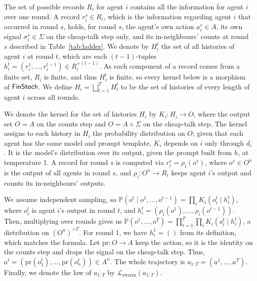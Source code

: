 \begin{definition}[Swarm]\label{def:swarm}
    The set of possible records $R_i$ for agent $i$ contains all the information for agent $i$ over one round.
    A record $r^s_i \in R_i$, which is the information regarding agent $i$ that occurred in round $s$, holds, for round $s$, the agent's own action $a^s_i \in A$, its own signal $\sigma^s_i \in \Sigma$ on the cheap-talk step only, and its in-neighbours' counts at round $s$ described in Table~\ref{tab:ladder}.
    We denote by $H^t_i$ the set of all histories of agent $i$ at round $t$, which are each $(t-1)$-tuples $h^t_i = (r^1_i, \ldots, r^{t-1}_i) \in R^{\times(t-1)}_i$.
    As each component of a record comes from a finite set, $R_i$ is finite, and thus $H^t_i$ is finite, so every kernel below is a morphism of $\mathsf{FinStoch}$.
    We define $H_i = \bigsqcup_{t=1}^{T} H_i^t$ to be the set of histories of every length of agent $i$ across all rounds.
    
    We denote the kernel for the set of histories $H_i$ by $K_i \colon H_i \to O$, where the output set $O = A$ on the counts step and $O = A \times \Sigma$ on the cheap-talk step.
    The kernel assigns to each history in $H_i$ the probability distribution on $O$; given that each agent has the same model and prompt template, $K_i$ depends on $i$ only through $d_i$.
    It is the model's distribution over its output, given the prompt built from $h$, at temperature 1.
    A record for round $s$ is computed via $r^s_i = \rho_i(o^s)$, where $o^s \in O^n$ is the output of all agents in round $s$, and $\rho_i \colon O^n \to R_i$ keeps agent $i$'s output and counts its in-neighbours' outputs.

    We assume independent sampling, so $\mathbb{P}(o^t \mid o^1, \ldots, o^{t-1}) = \prod_i K_i(o^t_i \mid h^t_i)$, where $o^t_i$ is agent $i$'s output in round $t$, and $h^t_i = (\rho_i(o^1), \ldots, \rho_i(o^{t-1}))$.
    Then, multiplying over rounds gives us $\mathbb{P}(o^1, \ldots, o^T) = \prod_{t=1}^T \prod_i K_i(o^t_i \mid h^t_i)$, a distribution on $(O^n)^{\times T}$.
    For round 1, we have $h^1_i = ()$ from its definition, which matches the formula.
    Let $\mathrm{pr} \colon O \to A$ keep the action, so it is the identity on the counts step and drops the signal on the cheap-talk step.
    Thus, $a^t = (\mathrm{pr}(o^t_1), \ldots, \mathrm{pr}(o^t_n)) \in A^n$.
    The whole trajectory is $a_{1:T} = (a^1, \ldots, a^T)$.
    Finally, we denote the law of $a_{1:T}$ by $\mathcal{L}_{\text{swarm}}(a_{1:T})$.
\end{definition}
